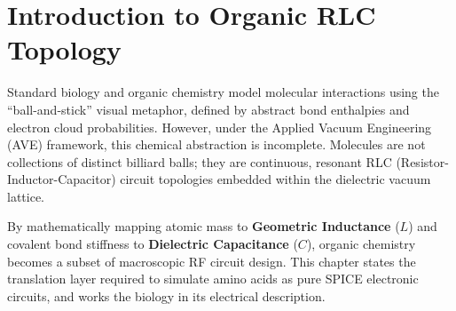 \section{Introduction to Organic RLC Topology}

Standard biology and organic chemistry model molecular interactions using the ``ball-and-stick'' visual metaphor, defined by abstract bond enthalpies and electron cloud probabilities. However, under the Applied Vacuum Engineering (AVE) framework, this chemical abstraction is incomplete. Molecules are not collections of distinct billiard balls; they are continuous, resonant RLC (Resistor-Inductor-Capacitor) circuit topologies embedded within the dielectric vacuum lattice.

By mathematically mapping atomic mass to \textbf{Geometric Inductance} ($L$) and covalent bond stiffness to \textbf{Dielectric Capacitance} ($C$), organic chemistry becomes a subset of macroscopic RF circuit design. This chapter states the translation layer required to simulate amino acids as pure SPICE electronic circuits, and works the biology in its electrical description.

